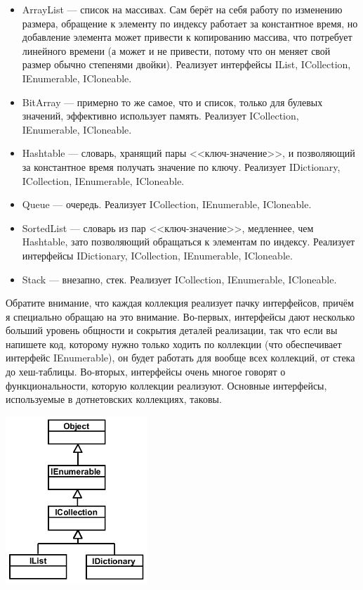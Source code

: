 \documentclass[a5paper]{article}
\begin{document}
\begin{itemize}
    \item ArrayList --- список на массивах. Сам берёт на себя работу по изменению размера, обращение к элементу по индексу работает за константное время, но добавление элемента может привести к копированию массива, что потребует линейного времени (а может и не привести, потому что он меняет свой размер обычно степенями двойки). Реализует интерфейсы IList, ICollection, IEnumerable, ICloneable.
    \item BitArray --- примерно то же самое, что и список, только для булевых значений, эффективно использует память. Реализует ICollection, IEnumerable, ICloneable.
    \item Hashtable --- словарь, хранящий пары <<ключ-значение>>, и позволяющий за константное время получать значение по ключу. Реализует IDictionary, ICollection, IEnumerable, ICloneable.
    \item Queue --- очередь. Реализует ICollection, IEnumerable, ICloneable.
    \item SortedList --- словарь из пар <<ключ-значение>>, медленнее, чем Hashtable, зато позволяющий обращаться к элементам по индексу. Реализует интерфейсы IDictionary, ICollection, IEnumerable, ICloneable.
    \item Stack --- внезапно, стек. Реализует ICollection, IEnumerable, ICloneable.
\end{itemize}

Обратите внимание, что каждая коллекция реализует пачку интерфейсов, причём я специально обращаю на это внимание. Во-первых, интерфейсы дают несколько больший уровень общности и сокрытия деталей реализации, так что если вы напишете код, которому нужно только ходить по коллекции (что обеспечивает интерфейс IEnumerable), он будет работать для вообще всех коллекций, от стека до хеш-таблицы. Во-вторых, интерфейсы очень многое говорят о функциональности, которую коллекции реализуют. Основные интерфейсы, используемые в дотнетовских коллекциях, таковы.

\begin{center}
    \includegraphics[width=0.4\textwidth]{interfaces.png}
\end{center}
\end{document}
